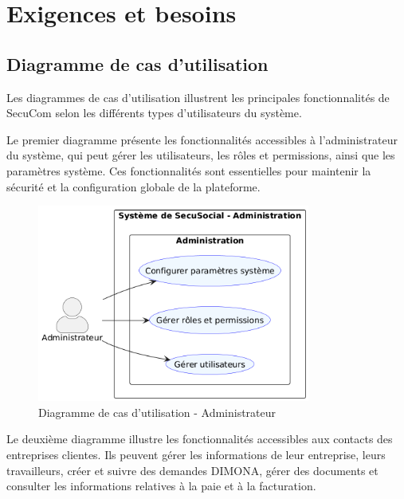 \chapter{Exigences et besoins}

\section{Diagramme de cas d'utilisation}

Les diagrammes de cas d'utilisation illustrent les principales fonctionnalités de SecuCom selon les différents types d'utilisateurs du système.

Le premier diagramme présente les fonctionnalités accessibles à l'administrateur du système, qui peut gérer les utilisateurs, les rôles et permissions, ainsi que les paramètres système. Ces fonctionnalités sont essentielles pour maintenir la sécurité et la configuration globale de la plateforme.

\begin{figure}[h]
\centering
\includegraphics[width=0.8\textwidth]{AdminUC.png}
\caption{Diagramme de cas d'utilisation - Administrateur}
\end{figure}

Le deuxième diagramme illustre les fonctionnalités accessibles aux contacts des entreprises clientes. Ils peuvent gérer les informations de leur entreprise, leurs travailleurs, créer et suivre des demandes DIMONA, gérer des documents et consulter les informations relatives à la paie et à la facturation.


